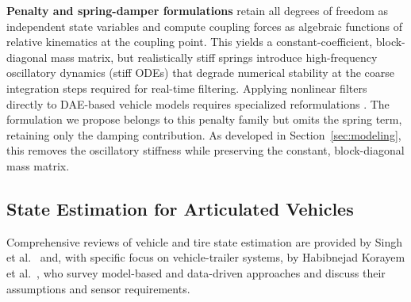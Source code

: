\documentclass[conference]{IEEEtran}
\begin{document}
\textbf{Penalty and spring-damper formulations} retain all degrees of freedom as independent state variables and compute coupling forces as algebraic functions of relative kinematics at the coupling point. This yields a constant-coefficient, block-diagonal mass matrix, but realistically stiff springs introduce high-frequency oscillatory dynamics (stiff ODEs) that degrade numerical stability at the coarse integration steps required for real-time filtering. Applying nonlinear filters directly to DAE-based vehicle models requires specialized reformulations \cite{becerra_applying_2001, purohit_development_2018}. The formulation we propose belongs to this penalty family but omits the spring term, retaining only the damping contribution. As developed in Section~\ref{sec:modeling}, this removes the oscillatory stiffness while preserving the constant, block-diagonal mass matrix.
%

\subsection{State Estimation for Articulated Vehicles}

Comprehensive reviews of vehicle and tire state estimation are provided by Singh et al.~\cite{singh_literature_2019} and, with specific focus on vehicle-trailer systems, by Habibnejad Korayem et al.~\cite{habibnejad_korayem_review_2022}, who survey model-based and data-driven approaches and discuss their assumptions and sensor requirements.
\end{document}
